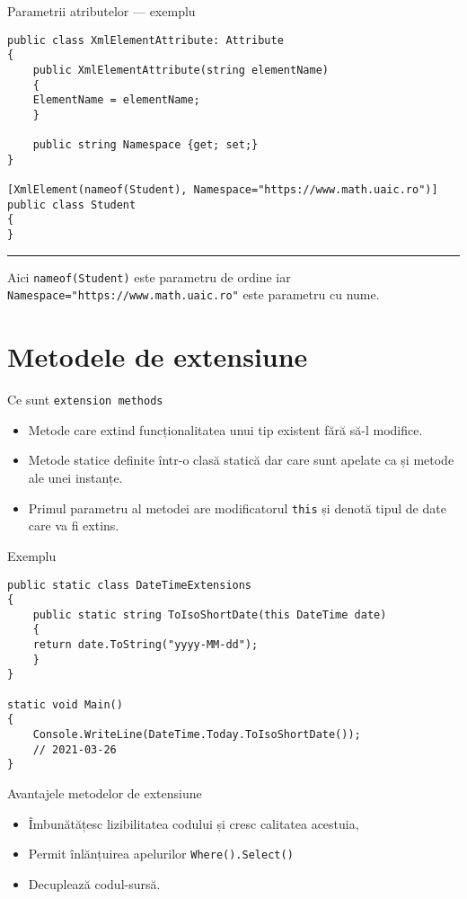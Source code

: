 \documentclass[presentation]{beamer}
\begin{document}
\begin{frame}[label={sec:org8a8564f},fragile]{Parametrii atributelor --- exemplu}
 \begin{verbatim}
public class XmlElementAttribute: Attribute
{
    public XmlElementAttribute(string elementName)
    {
	ElementName = elementName;
    }

    public string Namespace {get; set;}
}

[XmlElement(nameof(Student), Namespace="https://www.math.uaic.ro")]
public class Student
{
}
\end{verbatim}

\noindent\rule{\textwidth}{0.5pt}
Aici \texttt{nameof(Student)} este parametru de ordine iar \texttt{Namespace="https://www.math.uaic.ro"} este parametru cu nume.
\end{frame}
\section{Metodele de extensiune}
\label{sec:org6922921}
\begin{frame}[label={sec:orgc4bf66b},fragile]{Ce sunt \texttt{extension methods}}
 \begin{itemize}
\item Metode care extind funcționalitatea unui tip existent fără să-l modifice.
\item Metode statice definite într-o clasă statică dar care sunt apelate ca și metode ale unei instanțe.
\item Primul parametru al metodei are modificatorul \texttt{this} și denotă tipul de date care va fi extins.
\end{itemize}
\end{frame}
\begin{frame}[label={sec:org075460d},fragile]{Exemplu}
 \begin{verbatim}
public static class DateTimeExtensions
{
    public static string ToIsoShortDate(this DateTime date)
    {
	return date.ToString("yyyy-MM-dd");
    }
}

static void Main()
{
    Console.WriteLine(DateTime.Today.ToIsoShortDate());
    // 2021-03-26
}
\end{verbatim}
\end{frame}
\begin{frame}[label={sec:org6b8001e},fragile]{Avantajele metodelor de extensiune}
 \begin{itemize}
\item Îmbunătățesc lizibilitatea codului și cresc calitatea acestuia,
\item Permit înlănțuirea apelurilor \texttt{Where().Select()}
\item Decuplează codul-sursă.
\end{itemize}
\end{frame}
\end{document}
